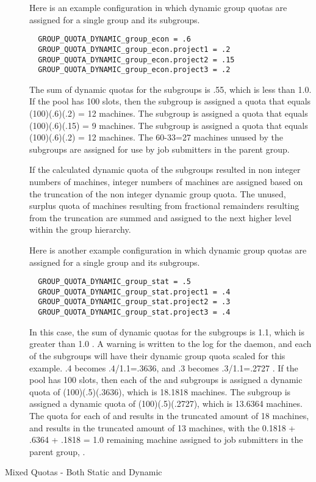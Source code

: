 \begin{description}
Here is an example configuration in which dynamic group quotas are assigned for
a single group and its subgroups.
\begin{verbatim}
  GROUP_QUOTA_DYNAMIC_group_econ = .6
  GROUP_QUOTA_DYNAMIC_group_econ.project1 = .2
  GROUP_QUOTA_DYNAMIC_group_econ.project2 = .15
  GROUP_QUOTA_DYNAMIC_group_econ.project3 = .2
\end{verbatim}
The sum of dynamic quotas for the subgroups is .55, 
which is less than 1.0.
If the pool has 100 slots, 
then the  subgroup is assigned a quota that
equals (100)(.6)(.2) = 12 machines. 
The  subgroup is assigned a quota that
equals (100)(.6)(.15) = 9 machines. 
The  subgroup is assigned a quota that
equals (100)(.6)(.2) = 12 machines. 
The 60-33=27 machines unused by the subgroups are assigned
for use by job submitters in the parent  group.

If the calculated dynamic quota of the subgroups resulted in non integer
numbers of machines,
integer numbers of machines are assigned based on the truncation of the
non integer dynamic group quota.
The unused, surplus quota of machines resulting from
fractional remainders resulting from the truncation are summed
and assigned to the next higher level within the group hierarchy.

Here is another example configuration in which dynamic group quotas 
are assigned for a single group and its subgroups.
\begin{verbatim}
  GROUP_QUOTA_DYNAMIC_group_stat = .5
  GROUP_QUOTA_DYNAMIC_group_stat.project1 = .4
  GROUP_QUOTA_DYNAMIC_group_stat.project2 = .3
  GROUP_QUOTA_DYNAMIC_group_stat.project3 = .4
\end{verbatim}
In this case, the sum of dynamic quotas for the subgroups is 1.1, 
which is greater than 1.0 .
A warning is written to the log for the  daemon,
and each of the subgroups will have their dynamic group quota scaled
for this example.
.4 becomes .4/1.1=.3636,
and .3 becomes .3/1.1=.2727 .
If the pool has 100 slots, 
then each of the  and  subgroups 
is assigned a dynamic quota of
(100)(.5)(.3636), which is 18.1818 machines. 
The  subgroup is assigned a dynamic quota of
(100)(.5)(.2727), which is 13.6364 machines. 
The quota for each of  and  results 
in the truncated amount of 18 machines,
and  results in the truncated amount of 13 machines,
with the 0.1818 + .6364 + .1818 = 1.0 remaining machine assigned to
job submitters in the parent group, . 


\item[Mixed Quotas - Both Static and Dynamic]
\end{description}
\MoreTodo

